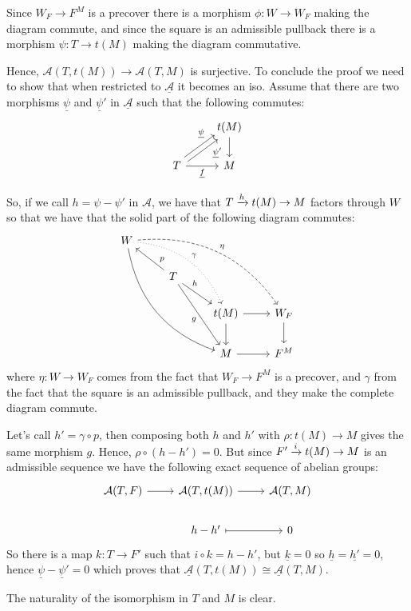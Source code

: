 Since $W_F\to F^M$ is a precover there is a morphism $\phi:W\to W_F$ making the diagram commute, and
since the square is an admissible pullback there is a morphism $\psi:T\to t(M)$ making the diagram commutative.

Hence, $\mathcal{A}(T,t(M))\to \mathcal{A}(T,M)$ is surjective. To conclude the proof we need to show
that when restricted to $\underline{\mathcal{A}}$ it becomes an iso. Assume that there are two morphisms
$\underline{\psi}$ and $\underline{\psi}'$ in $\underline{\mathcal{A}}$ such that the following commutes:
\begin{equation*}
  \begin{tikzcd}
    & t(M)\arrow{d}\\
    T\arrow[shift left=-1]{ur}[near end,']{\underline{\psi}'}
    \arrow[shift left=1]{ur}[near end]{\underline{\psi}}
    \arrow{r}[']{\underline{f}}
      & M
  \end{tikzcd}
\end{equation*}

So, if we call $h=\psi-\psi'$ in $\mathcal{A}$, we have that $T\xrightarrow{h} t(M) \to M$ factors through $W$
so that we have that the solid part of the following diagram commutes:
\begin{equation*}
  \begin{tikzcd}
    W\arrow[bend right]{dddrr}\arrow[bend left,dashed]{rrrdd}{\eta}
      \arrow[bend left,dotted]{ddrr}{\gamma}
      & & &\\
      & T\arrow{ul}[near start,']{p}\arrow{ddr}[']{g}\arrow{dr}[near start]{h}
        & & \\
      & & t(M)\arrow{d}\arrow{r}
          & W_F\arrow{d}\\
      & & M\arrow{r}
          & F^M
  \end{tikzcd}
\end{equation*}
where $\eta:W\to W_F$ comes from the fact that $W_F\to F^M$ is a precover, and $\gamma$ from the fact that
the square is an admissible pullback, and they make the complete diagram commute.

Let's call $h'=\gamma\circ p$, then composing both $h$ and $h'$ with $\rho:t(M)\to M$ gives the same morphism $g$.
Hence, $\rho\circ(h-h')=0$. But since $F'\xrightarrow{i} t(M) \to M$ is an admissible sequence we have the following exact
sequence of abelian groups:
\begin{equation*}
  \begin{tikzcd}
    \mathcal{A}(T,F)\arrow{r}
      & \mathcal{A}(T,t(M))\arrow{r}
        & \mathcal{A}(T,M)\\
      & h-h'\arrow[mapsto]{r}
        & 0
  \end{tikzcd}
\end{equation*}
So there is a map $k:T\to F'$ such that $i\circ k = h-h'$, but $\underline{k}=0$ so
$\underline{h}=\underline{h'}=0$, hence $\underline{\psi} - \underline{\psi}' =0$ which proves that
$\underline{\mathcal{A}}(T,t(M))\cong \underline{\mathcal{A}}(T,M)$.

The naturality of the isomorphism in $T$ and $M$ is clear.

